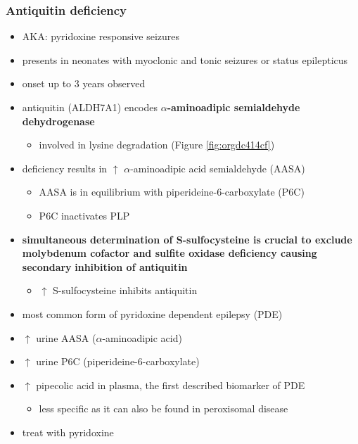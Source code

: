 \documentclass[12pt]{scrartcl}
\begin{document}
\subsubsection{Antiquitin deficiency}
\label{sec:org1f178c0}
\begin{itemize}
\item AKA: pyridoxine responsive seizures
\item presents in neonates with myoclonic and tonic seizures or
status epilepticus
\item onset up to 3 years observed
\item antiquitin (ALDH7A1) encodes \textbf{\(\alpha\)-aminoadipic semialdehyde dehydrogenase}
\begin{itemize}
\item involved in lysine degradation (Figure \ref{fig:orgdc414cf})
\end{itemize}
\end{itemize}
\begin{itemize}
\item deficiency results in \(\uparrow\) \(\alpha\)-aminoadipic acid semialdehyde (AASA)
\begin{itemize}
\item AASA is in equilibrium with piperideine-6-carboxylate (P6C)
\item P6C inactivates PLP
\end{itemize}
\end{itemize}
\begin{itemize}
\item \textbf{simultaneous determination of S-sulfocysteine is crucial to exclude}
\textbf{molybdenum cofactor and sulfite oxidase deficiency causing secondary}
\textbf{inhibition of antiquitin}
\begin{itemize}
\item \(\uparrow\) S-sulfocysteine inhibits antiquitin
\end{itemize}
\item most common form of pyridoxine dependent epilepsy (PDE)
\item \(\uparrow\) urine AASA (\(\alpha\)-aminoadipic acid)
\item \(\uparrow\) urine P6C (piperideine-6-carboxylate)
\item \(\uparrow\) pipecolic acid in plasma, the first described biomarker of PDE
\begin{itemize}
\item less specific as it can also be found in peroxisomal disease
\end{itemize}
\item treat with pyridoxine
\end{itemize}
\end{document}
